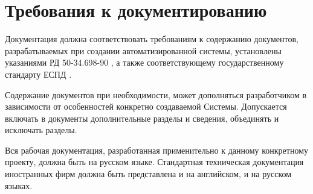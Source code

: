 \section{Требования к документированию}
Документация должна соответствовать требованиям к содержанию документов,
разрабатываемых при создании автоматизированной системы, установлены указаниями
РД 50-34.698-90 , а также соответствующему государственному стандарту ЕСПД
.

Содержание документов при необходимости, может дополняться разработчиком в
зависимости от особенностей конкретно создаваемой Системы. Допускается включать
в документы дополнительные разделы и сведения, объединять и исключать разделы.

Вся рабочая документация, разработанная применительно к данному конкретному
проекту, должна быть на русском языке. Стандартная техническая документация
иностранных фирм должна быть представлена и на английском, и на русском языках.
